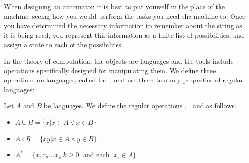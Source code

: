 \documentclass[12pt, a4paper, oneside, openright, titlepage]{book}
\begin{document}
When designing an automaton it is best to put yourself in the place of the machine, seeing how you would perform the tasks you need the machine to. Once you have determined the necessary information to remember about the string as it is being read, you represent this information as a finite list of possibilities, and assign a state to each of the possibilites. 


In the theory of computation, the objects are languages and the tools include operations specifically designed for manipulating them. We define three operations on languages, called the , and use them to study properties of regular languages: \begin{defn}
    Let $A$ and $B$ be languages. We define the regular operations , , and  as follows: \begin{itemize}
        \item {} $A\cup B = \{x\vert x \in A\lor x \in B\}$
        \item {} $A\circ B = \{xy\vert x \in A\land y \in B\}$
        \item {} $A^* = \{x_1x_2...x_k\vert k \geq 0\;\text{ and each }\;x_i \in A\}$.
    \end{itemize}
\end{defn}
\end{document}
